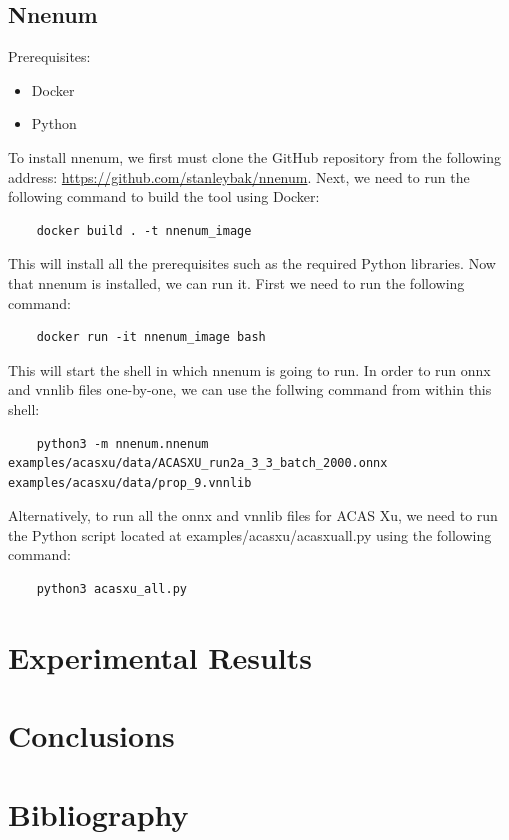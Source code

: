 \documentclass{article}
\begin{document}
\subsection{Nnenum}
Prerequisites: 
\begin{itemize}
    \item Docker
    \item Python
\end{itemize}
To install nnenum, we first must clone the GitHub repository from the following address:  \url{https://github.com/stanleybak/nnenum}.
Next, we need to run the following command to build the tool using Docker:
\begin{verbatim}
    docker build . -t nnenum_image
\end{verbatim}
This will install all the prerequisites such as the required Python libraries.
\newline
Now that nnenum is installed, we can run it. First we need to run the following command:
\begin{verbatim}
    docker run -it nnenum_image bash
\end{verbatim}
This will start the shell in which nnenum is going to run.
\newline
In order to run onnx and vnnlib files one-by-one, we can use the follwing command from within this shell:
\begin{verbatim}
    python3 -m nnenum.nnenum examples/acasxu/data/ACASXU_run2a_3_3_batch_2000.onnx examples/acasxu/data/prop_9.vnnlib
\end{verbatim}
Alternatively, to run all the onnx and vnnlib files for ACAS Xu, we need to run the Python script located at examples/acasxu/acasxu\textunderscore all.py using the following command:
\begin{verbatim}
    python3 acasxu_all.py
\end{verbatim}
\clearpage

\section{Experimental Results}
\section{Conclusions}
\section{Bibliography}


\end{document}
